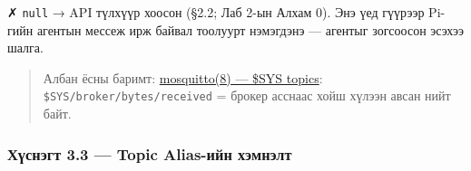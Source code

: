\begin{Shaded}
\begin{Highlighting}[]
 \KeywordTok{\{} \StringTok{:} \KeywordTok{\textbackslash{}}
   \KeywordTok{\textbackslash{}}
  \KeywordTok{|}  \KeywordTok{;} \KeywordTok{\}}
\KeywordTok{;} \VariableTok{)}
\OperatorTok{\textgreater{}}
\KeywordTok{;} \VariableTok{)}
\OperatorTok{\textgreater{}}
\KeywordTok{;} \VariableTok{)}
 \VariableTok{$((}\VariableTok{))}\VariableTok{$((}\VariableTok{))} \KeywordTok{|} 
\end{Highlighting}
\end{Shaded}

✗ \texttt{null} → API түлхүүр хоосон (§2.2; Лаб 2-ын Алхам 0). Энэ үед гүүрээр Pi-гийн агентын мессеж ирж байвал тоолуурт нэмэгдэнэ --- агентыг зогсоосон эсэхээ шалга.

\begin{quote}
Албан ёсны баримт: \href{https://mosquitto.org/man/mosquitto-8.html}{mosquitto(8) --- \$SYS topics}: \texttt{\$SYS/\allowbreak{}broker/\allowbreak{}bytes/\allowbreak{}received} = брокер асснаас хойш хүлээн авсан нийт байт.
\end{quote}

\hypertarget{ux445ux4afux441ux43dux44dux433ux442-3.3-topic-alias-ux438ux439ux43d-ux445ux44dux43cux43dux44dux43bux442}{%
\subsubsection{Хүснэгт 3.3 --- Topic Alias-ийн хэмнэлт}\label{ux445ux4afux441ux43dux44dux433ux442-3.3-topic-alias-ux438ux439ux43d-ux445ux44dux43cux43dux44dux43bux442}}


